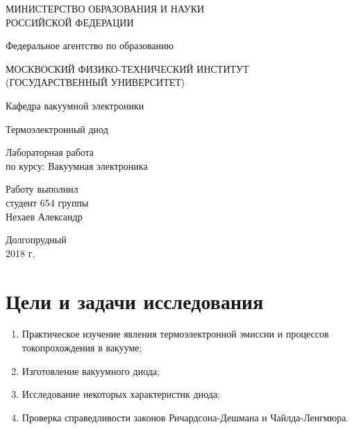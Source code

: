 \documentclass[a4paper, 12pt]{article}
\begin{document}
	\begin{titlepage}
	\begin{center}
		\large{МИНИСТЕРСТВО ОБРАЗОВАНИЯ И НАУКИ\\РОССИЙСКОЙ ФЕДЕРАЦИИ}
		
		Федеральное агентство по образованию
		\vspace{0.5cm}
		
		\large{МОСКВОСКИЙ ФИЗИКО-ТЕХНИЧЕСКИЙ ИНСТИТУТ\\(ГОСУДАРСТВЕННЫЙ УНИВЕРСИТЕТ)}
		\vspace{0.5cm}
		
		Кафедра вакуумной электроники
		\vfill
		
		{\LARGE Термоэлектронный диод}
		\bigskip
		
		Лабораторная работа\\
		по курсу: Вакуумная электроника 
	\end{center}
	\vfill
	
	\hfill\begin{minipage}{0.4\textwidth}
		Работу выполнил\\
		студент 654 группы\\
		Нехаев Александр
	\end{minipage}
	\vfill
	
	\begin{center}
		Долгопрудный\\2018 г.
	\end{center}
	\end{titlepage}
	\tableofcontents
	\newpage
	\section{Цели и задачи исследования}
	\begin{enumerate}
		\item Практическое изучение явления термоэлектронной эмиссии и процессов токопрохождения в вакууме;
		\item Изготовление вакуумного диода;
		\item Исследование некоторых характеристик диода;
		\item Проверка справедливости законов Ричардсона-Дешмана и Чайлда-Ленгмюра.
	\end{enumerate}
\end{document}
